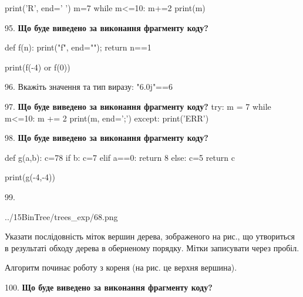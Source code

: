 \documentclass[11pt]{article}
\begin{document}
print('R', end=' ')
m=7
while m<=10:
    m+=2
print(m)

\par\vspace{5mm}
95. \textbf{Що буде виведено за виконання фрагменту коду?}

def f(n):
    print("f", end="");
    return n==1

print(f(-4) or f(0))
\par\vspace{5mm}
96. 
Вкажіть значення та тип виразу:
"6.0j"==6
\par\vspace{5mm}
97. \textbf{Що буде виведено за виконання фрагменту коду?}
try:
    m = 7
    while m<=10:
        m += 2
    print(m, end=';')
except:
    print('ERR')
\par\vspace{5mm}
98. \textbf{Що буде виведено за виконання фрагменту коду?}

def g(a,b):
    c=78
    if b:
        c=7
    elif a==0:
         return 8
    else: 
        c=5
    return c

print(g(-4,-4))\par\vspace{5mm}
99. 

\begin{center}
	{../15BinTree/trees_exp/68.png}
\end{center}
Указати послідовність міток вершин дерева, зображеного на рис., що утвориться в результаті обходу дерева в оберненому порядку. Мітки записувати через пробіл.\par Алгоритм починає роботу з кореня (на рис. це верхня вершина).
\par\vspace{5mm}
100. \textbf{Що буде виведено за виконання фрагменту коду?}
\end{document}
